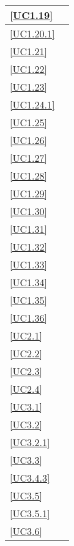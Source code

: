 \begin{longtable}{|P{6cm}|P{6cm}|}
	\hline \ref{UC1.19} &  \\
	\hline \ref{UC1.20.1} &  \\
	\hline \ref{UC1.21} &  \\
	\hline \ref{UC1.22} &  \\
	\hline \ref{UC1.23} &  \\
	\hline \ref{UC1.24.1} &  \\
	\hline \ref{UC1.25} &  \\
	\hline \ref{UC1.26} &  \\
	\hline \ref{UC1.27} &  \\
	\hline \ref{UC1.28} &  \\
	\hline \ref{UC1.29} &  \\
	\hline \ref{UC1.30} &  \\
	\hline \ref{UC1.31} &  \\
	\hline \ref{UC1.32} &  \\
	\hline \ref{UC1.33} &  \\
	\hline \ref{UC1.34} &  \\
	\hline \ref{UC1.35} &  \\
	\hline \ref{UC1.36} &  \\	
	\hline \ref{UC2.1} &  \\
	\hline \ref{UC2.2} &  \\
	\hline \ref{UC2.3} &  \\
	\hline \ref{UC2.4} &  \\	
	\hline \ref{UC3.1} &  \\
	\hline \ref{UC3.2} &  \\
	\hline \ref{UC3.2.1} &  \\
	\hline \ref{UC3.3} &  \\
	\hline \ref{UC3.4.3} &  \\
	\hline \ref{UC3.5} &  \\
	\hline \ref{UC3.5.1} &  \\
	\hline \ref{UC3.6} &  \\

\end{longtable}

